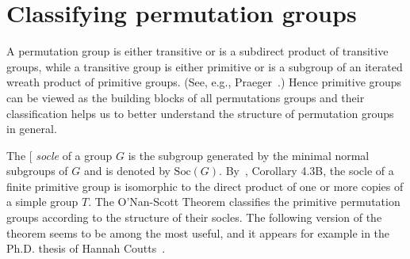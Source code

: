 \documentclass[cm,dissertation,actual,final]{uhthesis}
\theoremstyle{plain}
\theoremstyle{definition}
\theoremstyle{remark}
\numberwithin{theorem}{section}
\numberwithin{claim}{chapter}
\numberwithin{equation}{section}
\numberwithin{conjecture}{chapter}
\newcommand{\<}{\ensuremath{\langle}}
\renewcommand{\>}{\ensuremath{\rangle}}
\newcommand{\0}{\ensuremath{\mathbf{0}}}
\newcommand{\1}{\ensuremath{\mathbf{1}}}
\newcommand{\2}{\ensuremath{\mathbf{2}}}
\newcommand{\3}{\ensuremath{\mathbf{3}}}
\newcommand{\4}{\ensuremath{\mathbf{4}}}
\newcommand{\5}{\ensuremath{\mathbf{5}}}
\newcommand{\Soc}{\ensuremath{\mathrm{Soc}}}
\newcommand{\indexit}[1]{\index{#1|textit}}
\def\defn#1{\gdef\defnstring{#1}%
  \xdef\dodefnii{{\noexpand\em
       \defnstring}\noexpand\indexit{\defnstring}\noexpand\makeatother}%
  \futurelet\nextthing\dodefn}
\def\dodefn{%
  \ifx\nextthing[\let\next=\dodefni
    \else\let\next=\dodefnii\fi
  \makeatletter
  \next}
\def\dodefni[#1]{%
  {\em\defnstring}%
  \indexit{#1}%
  \makeatother}
\begin{document}
\section{Classifying permutation groups}
\label{sec:class-perm-groups}
A permutation group is either transitive
or is a subdirect product of transitive groups, while a transitive group is
either primitive or is a subgroup of an iterated wreath product of primitive
groups. (See, e.g., Praeger~\cite{Praeger:2006}.)
Hence primitive groups can be viewed as the building blocks of all
permutations groups and their classification helps us to better understand
the structure of permutation groups in general.

The \defn{socle} of a group $G$ is the subgroup generated by the minimal normal
subgroups of $G$ and is denoted by $\Soc(G)$. By~\cite{Dixon:1996}, Corollary
4.3B, the socle 
of a finite primitive group is isomorphic to the direct product of one or more
copies of a simple group $T$.  The O'Nan-Scott Theorem classifies the primitive
permutation groups according to the structure of their socles.  The following
version of the theorem seems to be among the most useful, and it appears for
example in the Ph.D. thesis of 
%
Hannah Coutts~\cite{Coutts:2010}.
\end{document}
